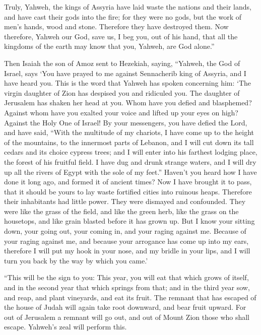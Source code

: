 {Truly, Yahweh, the kings of Assyria have laid waste the nations and their lands,
and have cast their gods into the fire; for they were no gods, but the work of men’s hands, wood and stone. Therefore they have destroyed them.
Now therefore, Yahweh our God, save us, I beg you, out of his hand, that all the kingdoms of the earth may know that you, Yahweh, are God alone.”
\par }{\PP {}Then Isaiah the son of Amoz sent to Hezekiah, saying, “Yahweh, the God of Israel, says ‘You have prayed to me against Sennacherib king of Assyria, and I have heard you.
This is the word that Yahweh has spoken concerning him: ‘The virgin daughter of Zion has despised you and ridiculed you. The daughter of Jerusalem has shaken her head at you.
Whom have you defied and blasphemed? Against whom have you exalted your voice and lifted up your eyes on high? Against the Holy One of Israel!
By your messengers, you have defied the Lord, and have said, “With the multitude of my chariots, I have come up to the height of the mountains, to the innermost parts of Lebanon, and I will cut down its tall cedars and its choice cypress trees; and I will enter into his farthest lodging place, the forest of his fruitful field.
I have dug and drunk strange waters, and I will dry up all the rivers of Egypt with the sole of my feet.”
Haven’t you heard how I have done it long ago, and formed it of ancient times? Now I have brought it to pass, that it should be yours to lay waste fortified cities into ruinous heaps.
Therefore their inhabitants had little power. They were dismayed and confounded. They were like the grass of the field, and like the green herb, like the grass on the housetops, and like grain blasted before it has grown up.
But I know your sitting down, your going out, your coming in, and your raging against me.
Because of your raging against me, and because your arrogance has come up into my ears, therefore I will put my hook in your nose, and my bridle in your lips, and I will turn you back by the way by which you came.’
\par }{\PP {}“This will be the sign to you: This year, you will eat that which grows of itself, and in the second year that which springs from that; and in the third year sow, and reap, and plant vineyards, and eat its fruit.
The remnant that has escaped of the house of Judah will again take root downward, and bear fruit upward.
For out of Jerusalem a remnant will go out, and out of Mount Zion those who shall escape. Yahweh’s zeal will perform this.
}
